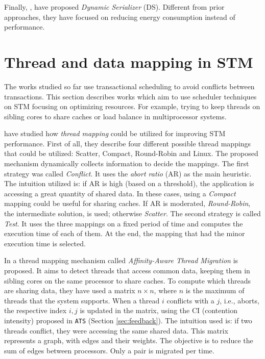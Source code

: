 Finally, , have proposed \emph{Dynamic Serializer} (DS). Different from prior approaches, they have focused on reducing energy consumption instead of performance.

\section{Thread and data mapping in STM}\label{sect:ThreadDataSTMRelated}

The works studied so far use transactional scheduling to avoid conflicts between transactions. This section describes works which aim to use scheduler techniques on STM focusing on optimizing resources. For example, trying to keep threads on sibling cores to share caches or load balance in multiprocessor systems.

 have studied how \emph{thread mapping} could be utilized for improving STM performance. First of all, they describe four different possible thread mappings that could be utilized: Scatter, Compact, Round-Robin and Linux. The proposed mechanism dynamically collects information to decide the mappings. The first strategy was called \emph{Conflict}. It uses the \emph{abort ratio} (AR) as the main heuristic. The intuition utilized is: if AR is high (based on a threshold), the application is accessing a great quantity of shared data. In these cases, using a \emph{Compact} mapping could be useful for sharing caches. If AR is moderated, \emph{Round-Robin}, the intermediate solution, is used; otherwise \emph{Scatter}. The second strategy is called \emph{Test}. It uses the three mappings on a fixed period of time and computes the execution time of each of them. At the end, the mapping that had the minor execution time is selected. 

In  a thread mapping mechanism called \emph{Affinity-Aware Thread Migration} is proposed. It aims to detect threads that access common data, keeping them in sibling cores on the same processor to share caches. To compute which threads are sharing data, they have used a matrix $n \times n$, where $n$ is the maximum of threads that the system supports. When a thread $i$ conflicts with a $j$, i.e., aborts, the respective index $i,j$ is updated in the matrix, using the CI (contention intensity) proposed in \texttt{ATS} (Section \ref{sec:feedback}). The intuition used is: if two threads conflict, they were accessing the same shared data. This matrix represents a graph, with edges and their weights. The objective is to reduce the sum of edges between processors. Only a pair is migrated per time. 

